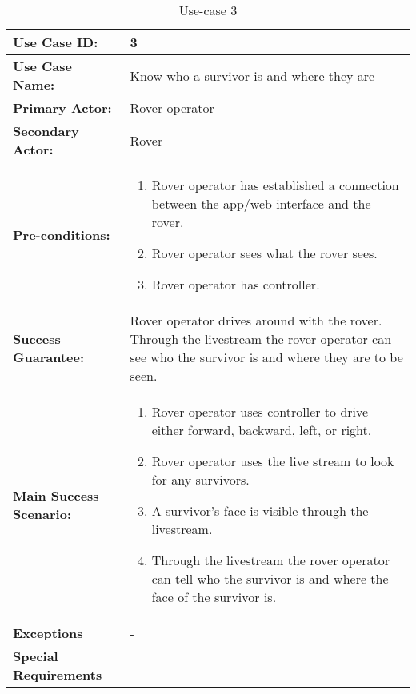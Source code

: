 \documentclass[12pt]{article}
\begin{document}
	 	\begin{table}[h]
	 		\centering
	 		\begin{tabularx}{\linewidth}{|X|X|}
	 			\hline
	 			\textbf{Use Case ID:} &3\\
	 			\hline
	 			\textbf{Use Case Name:} &Know who a survivor is and where they are\\
	 			\hline
	 			\textbf{Primary Actor:} &Rover operator\\
	 			\hline
	 			\textbf{Secondary Actor:} &Rover\\
	 			\hline
	 			\textbf{Pre-conditions:} &\begin{enumerate}
	 				\item Rover operator has established a connection between the app/web interface and the rover.
	 				\item Rover operator sees what the rover sees.
	 				\item Rover operator has controller.
	 			\end{enumerate}\\
	 			\hline
	 			\textbf{Success Guarantee:} &Rover operator drives around with the rover. Through the livestream the rover operator can see who the survivor is and where they are to be seen. \\
	 			\hline 
	 			\textbf{Main Success Scenario:} &\begin{enumerate}
	 				\item Rover operator uses controller to drive either forward, backward, left, or right.
	 				\item Rover operator uses the live stream to look for any survivors.
	 				\item A survivor’s face is visible through the livestream.
	 				\item Through the livestream the rover operator can tell who the survivor is and where the face of the survivor is.
	 			\end{enumerate}\\
	 			\hline
	 			\textbf{Exceptions} &-\\
	 			\hline
	 			\textbf{Special Requirements} &-\\
	 			\hline
	 		\end{tabularx}
	 		\caption{Use-case 3}
	 		\label{table:Use-case3}   
	 	\end{table}
\end{document}
